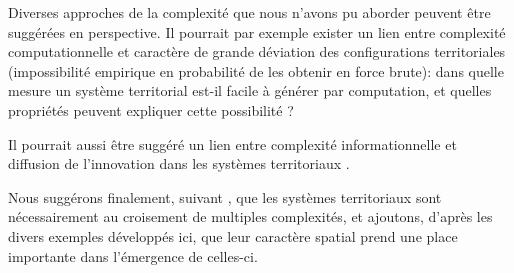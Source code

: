 \documentclass[11pt]{article}
\begin{document}
Diverses approches de la complexité que nous n'avons pu aborder peuvent être suggérées en perspective. Il pourrait par exemple exister un lien entre complexité computationnelle et caractère de grande déviation des configurations territoriales (impossibilité empirique en probabilité de les obtenir en force brute): dans quelle mesure un système territorial est-il facile à générer par computation, et quelles propriétés peuvent expliquer cette possibilité ?

Il pourrait aussi être suggéré un lien entre complexité informationnelle et diffusion de l'innovation dans les systèmes territoriaux \citep{favaro2011gibrat}.



Nous suggérons finalement, suivant \cite{raimbault2017complexity}, que les systèmes territoriaux sont nécessairement au croisement de multiples complexités, et ajoutons, d'après les divers exemples développés ici, que leur caractère spatial prend une place importante dans l'émergence de celles-ci.









\end{document}
